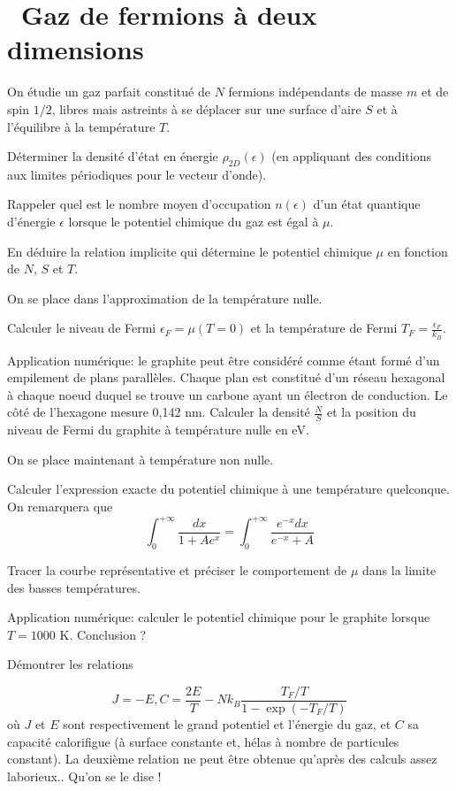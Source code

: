 \documentclass[utf8, 11pt]{feuille}
\begin{document}




\section{\medium~Gaz de fermions à deux dimensions}

On étudie un gaz parfait constitué de $N$ fermions indépendants de masse $m$ et de spin $1/2$, libres mais astreints à se déplacer sur une surface d'aire $S$ et à l'équilibre à la température $T$.

\question
Déterminer la densité d'état en énergie $\rho_{2D}(\epsilon)$ (en appliquant des conditions aux limites périodiques pour le vecteur d'onde). 

\question
Rappeler quel est le nombre moyen d'occupation $n(\epsilon)$ d'un état quantique d'énergie $\epsilon$ lorsque le potentiel chimique du gaz est égal à $\mu$.

\question
En déduire la relation implicite qui détermine le potentiel chimique $\mu$ en fonction de $N$, $S$ et $T$.

\medskip

On se place dans l'approximation de la température nulle.

\question
Calculer le niveau de Fermi $\epsilon_F=\mu(T=0)$ et la température de Fermi $T_F=\frac{\epsilon_F}{k_B}$.

\question
Application numérique: le graphite peut être considéré comme étant formé d'un empilement de plans parallèles. Chaque plan est constitué d'un réseau hexagonal à chaque noeud duquel se trouve un carbone ayant un électron de conduction. Le côté de l'hexagone mesure 0,142 nm. Calculer la densité $\frac{N}{S}$ et la position du niveau de Fermi du graphite à température nulle en eV.

\medskip

On se place maintenant à température non nulle.

\question
Calculer l'expression exacte du potentiel chimique à une température quelconque. On remarquera que
$$
\int_0^{+\infty} \frac{dx}{1+A e^x}=\int_0^{+\infty} \frac{e^{-x}dx}{e^{-x}+A}
$$

\question
Tracer la courbe représentative et préciser le comportement de $\mu$ dans la limite des basses températures.

\question
Application numérique: calculer le potentiel chimique pour le graphite lorsque $T=1000$ K. Conclusion ?

\question
Démontrer les relations

$$
J=-E,   C=\frac{2E}{T}- Nk_B\frac{T_F/T}{1-\exp(-T_F/T)}
$$
où $J$ et $E$ sont respectivement le grand potentiel et l'énergie du gaz, et $C$ sa capacité calorifigue (à surface constante et, hélas à nombre de particules constant). La deuxième relation ne peut être obtenue qu'après des calculs assez laborieux.. Qu'on se le dise !
\end{document}
